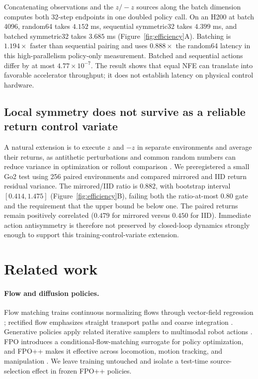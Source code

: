 \documentclass{article}
\begin{document}
Concatenating observations and the $z/-z$ sources along the batch dimension
computes both 32-step endpoints in one doubled policy call. On an H200 at batch
4096, random64 takes $4.152$ ms, sequential symmetric32 takes $4.399$ ms, and
batched symmetric32 takes $3.685$ ms (Figure~\ref{fig:efficiency}A). Batching is
$1.194\times$ faster than sequential pairing and uses $0.888\times$ the
random64 latency in this high-parallelism policy-only measurement. Batched and
sequential actions differ by at most $4.77\times10^{-7}$. The result shows that
equal NFE can translate into favorable accelerator throughput; it does not
establish latency on physical control hardware.

\subsection{Local symmetry does not survive as a reliable return control variate}

A natural extension is to execute $z$ and $-z$ in separate environments and
average their returns, as antithetic perturbations and common random numbers
can reduce variance in optimization or rollout comparison
\citep{salimans2017es,yu2018antithetic,yadav2026crn}. We preregistered a small
Go2 test using 256 paired environments and compared mirrored and IID return
residual variance. The mirrored/IID ratio is $0.882$, with bootstrap interval
$[0.414,1.475]$ (Figure~\ref{fig:efficiency}B), failing both the ratio-at-most
$0.80$ gate and the requirement that the upper bound be below one. The paired
returns remain positively correlated ($0.479$ for mirrored versus $0.450$ for
IID). Immediate action antisymmetry is therefore not preserved by closed-loop
dynamics strongly enough to support this training-control-variate extension.

\section{Related work}

\paragraph{Flow and diffusion policies.}
Flow matching trains continuous normalizing flows through vector-field
regression \citep{lipman2022flowmatching}; rectified flow emphasizes straight
transport paths and coarse integration \citep{liu2022rectified}. Generative
policies apply related iterative samplers to multimodal robot actions
\citep{chi2023diffusionpolicy}. FPO introduces a conditional-flow-matching
surrogate for policy optimization, and FPO++ makes it effective across
locomotion, motion tracking, and manipulation
\citep{mcallister2025flowpolicy,yi2026flowcontrol}. We leave training untouched
and isolate a test-time source-selection effect in frozen FPO++ policies.
\end{document}
